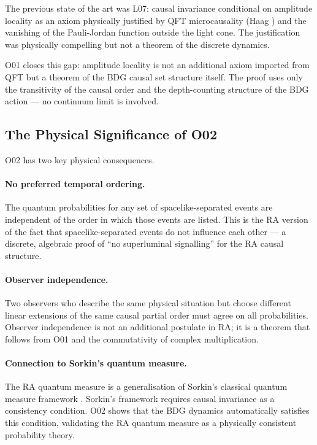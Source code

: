 \documentclass[12pt,a4paper]{article}
\begin{document}
The previous state of the art was L07: causal invariance conditional on amplitude locality as an axiom physically justified by QFT microcausality (Haag \cite{Haag1996}) and the vanishing of the Pauli-Jordan function outside the light cone.  The justification was physically compelling but not a theorem of the discrete dynamics.

O01 closes this gap: amplitude locality is not an additional axiom imported from QFT but a theorem of the BDG causal set structure itself.  The proof uses only the transitivity of the causal order and the depth-counting structure of the BDG action --- no continuum limit is involved.

\subsection{The Physical Significance of O02}

O02 has two key physical consequences.

\paragraph{No preferred temporal ordering.}  The quantum probabilities for any set of spacelike-separated events are independent of the order in which those events are listed.  This is the RA version of the fact that spacelike-separated events do not influence each other --- a discrete, algebraic proof of ``no superluminal signalling'' for the RA causal structure.

\paragraph{Observer independence.}  Two observers who describe the same physical situation but choose different linear extensions of the same causal partial order must agree on all probabilities.  Observer independence is not an additional postulate in RA; it is a theorem that follows from O01 and the commutativity of complex multiplication.

\paragraph{Connection to Sorkin's quantum measure.}  The RA quantum measure is a generalisation of Sorkin's classical quantum measure framework \cite{Sorkin1994}.  Sorkin's framework requires causal invariance as a consistency condition.  O02 shows that the BDG dynamics automatically satisfies this condition, validating the RA quantum measure as a physically consistent probability theory.
\end{document}
